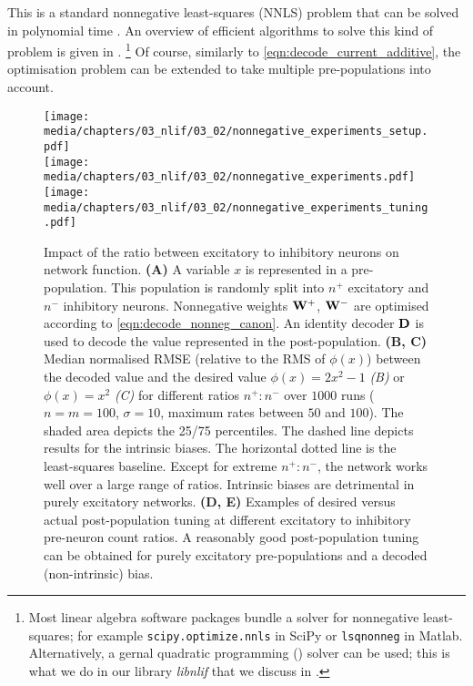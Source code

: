 This is a standard nonnegative least-squares (NNLS) problem that can be solved in polynomial time \citep[Chapter~23]{lawson1995solving}.
An overview of efficient algorithms to solve this kind of problem is given in \citet{chen2009nonnegativity}.%
\footnote{Most linear algebra software packages bundle a solver for nonnegative least-squares; for example \texttt{scipy.optimize.nnls} in SciPy or \texttt{lsqnonneg} in Matlab. Alternatively, a gernal quadratic programming (\QP) solver can be used; this is what we do in our library \emph{libnlif} that we discuss in .}
Of course, similarly to \cref{eqn:decode_current_additive}, the optimisation problem can be extended to take multiple pre-populations into account.

\begin{figure}[p]
	\centering
	\texttt{[image: media/chapters/03\_nlif/03\_02/nonnegative\_experiments\_setup.pdf]}\\[0.75cm]	\texttt{[image: media/chapters/03\_nlif/03\_02/nonnegative\_experiments.pdf]}\\[0.75cm]
	\texttt{[image: media/chapters/03\_nlif/03\_02/nonnegative\_experiments\_tuning.pdf]}%
	{\label{fig:nonnegative_experiments_a}}%
	{\label{fig:nonnegative_experiments_b}}%
	{\label{fig:nonnegative_experiments_c}}%
	{\label{fig:nonnegative_experiments_d}}%
	{\label{fig:nonnegative_experiments_e}}%
	\caption[Impact of the ratio between excitatory to inhibitory neurons on network function]{Impact of the ratio between excitatory to inhibitory neurons on network function.
	\textbf{(A)} A variable $x$ is represented in a pre-population. This population is randomly split into $n^+$ excitatory and $n^-$ inhibitory neurons. Nonnegative weights $\mathbf{W}^+$, $\mathbf{W}^-$ are optimised according to \cref{eqn:decode_nonneg_canon}. An identity decoder $\mathbf{D}$ is used to decode the value represented in the post-population.
	\textbf{(B, C)} Median normalised RMSE (relative to the RMS of $\phi(x)$) between the decoded value and the desired value $\phi(x) = 2x^2 - 1$ \emph{(B)} or $\phi(x) = x^2$ \emph{(C)} for different ratios $n^+ \!\! : \! n^-$ over $1000$ runs ($n = m = 100$, $\sigma = 10$, maximum rates between $50$ and $100$). The shaded area depicts the 25/75 percentiles. The dashed line depicts results for the intrinsic biases. The horizontal dotted line is the least-squares baseline.
	Except for extreme $n^+ \!\! : \! n^-$, the network works well over a large range of ratios.
	Intrinsic biases are detrimental in purely excitatory networks.
	\textbf{(D, E)} Examples of desired versus actual post-population tuning at different excitatory to inhibitory pre-neuron count ratios.
	A reasonably good post-population tuning can be obtained for purely excitatory pre-populations and a decoded (non-intrinsic) bias.
	}
	\label{fig:nonnegative_experiments}
\end{figure}


